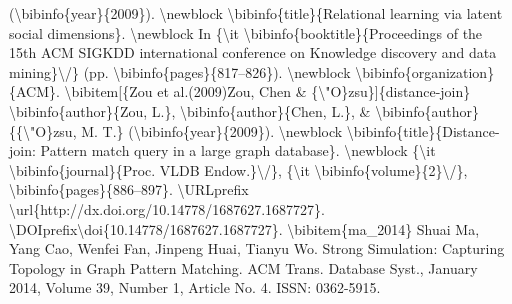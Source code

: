 \documentclass{article}%
\begin{document}
(\textbackslash{}bibinfo\{year\}\{2009\}).\newline%
\textbackslash{}newblock \textbackslash{}bibinfo\{title\}\{Relational learning via latent social dimensions\}.\newline%
\textbackslash{}newblock In \{\textbackslash{}it \textbackslash{}bibinfo\{booktitle\}\{Proceedings of the 15th ACM SIGKDD\newline%
international conference on Knowledge discovery and data mining\}\textbackslash{}/\} (pp.\newline%
\textbackslash{}bibinfo\{pages\}\{817–826\}).\newline%
\textbackslash{}newblock \textbackslash{}bibinfo\{organization\}\{ACM\}.\newline%
\textbackslash{}bibitem{[}\{Zou et al.(2009)Zou, Chen \& \{\textbackslash{}"O\}zsu\}{]}\{distance{-}join\}\newline%
\textbackslash{}bibinfo\{author\}\{Zou, L.\}, \textbackslash{}bibinfo\{author\}\{Chen, L.\}, \&\newline%
\textbackslash{}bibinfo\{author\}\{\{\textbackslash{}"O\}zsu, M. T.\} (\textbackslash{}bibinfo\{year\}\{2009\}).\newline%
\textbackslash{}newblock \textbackslash{}bibinfo\{title\}\{Distance{-}join: Pattern match query in a large graph\newline%
database\}.\newline%
\textbackslash{}newblock \{\textbackslash{}it \textbackslash{}bibinfo\{journal\}\{Proc. VLDB Endow.\}\textbackslash{}/\}, \{\textbackslash{}it\newline%
\textbackslash{}bibinfo\{volume\}\{2\}\textbackslash{}/\}, \textbackslash{}bibinfo\{pages\}\{886–897\}. \textbackslash{}URLprefix\newline%
\textbackslash{}url\{http://dx.doi.org/10.14778/1687627.1687727\}.\newline%
\textbackslash{}DOIprefix\textbackslash{}doi\{10.14778/1687627.1687727\}.\newline%
\newline%
\textbackslash{}bibitem\{ma\_2014\}\newline%
Shuai Ma, Yang Cao, Wenfei Fan, Jinpeng Huai, Tianyu Wo.\newline%
Strong Simulation: Capturing Topology in Graph Pattern Matching.\newline%
ACM Trans. Database Syst., January 2014, Volume 39, Number 1, Article No. 4.\newline%
ISSN: 0362{-}5915.\newline%
\end{document}
